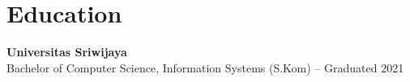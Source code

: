 \section*{Education}

\textbf{Universitas Sriwijaya} \\
Bachelor of Computer Science, Information Systems (S.Kom) -- Graduated 2021
